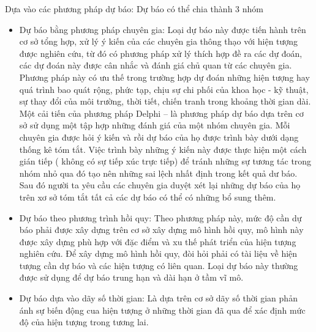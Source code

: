 Dựa vào các phương pháp dự báo: Dự báo có thể chia thành 3 nhóm
\begin{itemize}
    \item Dự báo bằng phương pháp chuyên gia: Loại dự báo này được tiến hành trên cơ sở tổng hợp, xử lý ý kiến của các chuyên gia thông thạo với hiện tượng được nghiên cứu, từ đó có phương pháp xử lý thích hợp đề ra các dự đoán, các dự đoán này được cân nhắc và đánh giá chủ quan từ các chuyên gia. Phương pháp này có ưu thế trong trường hợp dự đoán những hiện tượng hay quá trình bao quát rộng, phức tạp, chịu sự chi phối của khoa học - kỹ thuật, sự thay đổi của môi trường, thời tiết, chiến tranh trong khoảng thời gian dài. Một cải tiến của phương pháp Delphi – là phương pháp dự báo dựa trên cơ sở sử dụng một tập hợp những đánh giá của một nhóm chuyên gia. Mỗi chuyên gia được hỏi ý kiến và rồi dự báo của họ được trình bày dưới dạng thống kê tóm tắt. Việc trình bày những ý kiến này được thực hiện một cách gián tiếp ( không có sự tiếp xúc trực tiếp) để tránh những sự tương tác trong nhóm nhỏ qua đó tạo nên những sai lệch nhất định trong kết quả dư báo. Sau đó người ta yêu cầu các chuyên gia duyệt xét lại những dự báo của họ trên xơ sở tóm tắt tất cả các dự báo có thể có những bổ sung thêm. \\
    \item Dự báo theo phương trình hồi quy: Theo phương pháp này, mức độ cần dự báo phải được xây dựng trên cơ sở xây dựng mô hình hồi quy, mô hình này được xây dựng phù hợp với đặc điểm và xu thế phát triển của hiện tượng nghiên cứu. Để xây dựng mô hình hồi quy, đòi hỏi phải có tài liệu về hiện tượng cần dự báo và các hiện tượng có liên quan. Loại dự báo này thường được sử dụng để dự báo trung hạn và dài hạn ở tầm vĩ mô.
    \item Dự báo dựa vào dãy số thời gian: Là dựa trên cơ sở dãy số thời gian phản ánh sự biến động cua hiện tượng ở những thời gian đã qua để xác định mức độ của hiện tượng trong tương lai.
\end{itemize}

